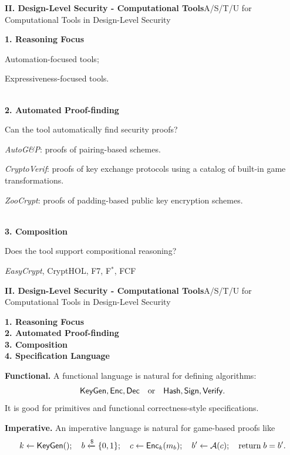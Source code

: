 \documentclass[10pt,aspectratio=1610,compress,dvipsnames]{beamer}
\begin{document}
\begin{frame}[fragile]{\bfseries II. Design-Level Security - Computational Tools}{A/S/T/U for Computational Tools in Design-Level Security}
	\begin{description}[style=nextline]
		\item[\textbf{Usability (U)}] \textbf{1. Reasoning Focus} \\
		\item[$\to$] Automation-focused tools;
		\item[$\to$] Expressiveness-focused tools.
		\item[] \;\\
		\textbf{2. Automated Proof-finding} \\ 
		\item[$\to$] Can the tool automatically find security proofs? \\
		\item[$\to$] \textit{AutoG\&P}: proofs of pairing-based schemes.
		\item[$\to$] \textit{CryptoVerif}: proofs of key exchange protocols using a catalog
		of built-in game transformations.
		\item[$\to$] \textit{ZooCrypt}: proofs of padding-based public key encryption schemes.
		\item[] \; \\
		\textbf{3. Composition}\\ 
		\item[$\to$] Does the tool support compositional
		reasoning?\\
		\item[$\to$] \textit{EasyCrypt}, CryptHOL, F7, F$^*$, FCF
	\end{description}
\end{frame}

\begin{frame}[fragile]{\bfseries II. Design-Level Security - Computational Tools}{A/S/T/U for Computational Tools in Design-Level Security}
	\begin{description}[style=nextline]
		\item[\textbf{Usability (U)}] \textbf{1. Reasoning Focus} \\
		\textbf{2. Automated Proof-finding} \\
		\textbf{3. Composition} \\
		\textbf{4. Specification Language}\\
		\item[$\to$] \textbf{\color{cseblue}Functional.}\; A functional language is natural for defining algorithms: \[
		\mathsf{KeyGen}, \mathsf{Enc}, \mathsf{Dec}\quad \text{or}\quad\mathsf{Hash},\mathsf{Sign},\mathsf{Verify}.
		\] It is good for primitives and functional correctness-style specifications.
		\item[]
		\item[$\to$] \textbf{\color{cseblue}Imperative.}\; An imperative language is natural for game-based proofs like \[
		k\gets\mathsf{KeyGen}();\quad b\xleftarrow{\$}\{0,1\};\quad c\gets\mathsf{Enc}_k(m_b);\quad b'\gets\mathcal A(c);\quad\text{return}\; b=b'.
		\]
	\end{description}
\end{frame}
\end{document}
